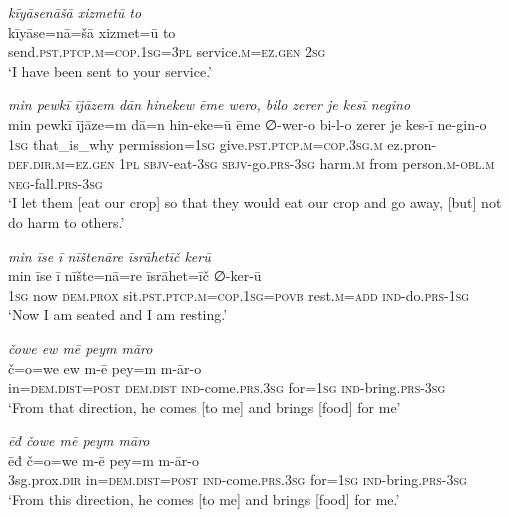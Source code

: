 \ea \label{PM.13}
\textit{kīyāsenāšā xizmetū to} \\ 
\gll kīyāse=nā=šā xizmet=ū to \\ 
 send\textsc{.pst}\textsc{.ptcp}\textsc{.m}\textsc{=cop}\textsc{.\textsc{1sg}}\textsc{=3pl} service\textsc{.m}\textsc{\textsc{=ez.gen}} \textsc{2sg} \\ 
\glt `I have been sent to your service.'
\z 
 
\ea \label{PM.36}
\textit{min pewkī ījāzem dān hinekew ēme wero, bilo zerer je kesī negino} \\ 
\gll min pewkī ījāze=m dā=n hin-eke=ū ēme ∅-wer-o bi-l-o zerer je kes-ī ne-gin-o \\ 
 \textsc{1sg} that\_is\_why permission\textsc{=\textsc{1sg}} give\textsc{.pst}\textsc{.ptcp}\textsc{.m}\textsc{=cop}\textsc{.3sg}\textsc{.m} ez.pron\textsc{-def}\textsc{.dir}\textsc{.m}\textsc{\textsc{=ez.gen}} \textsc{1pl} \textsc{sbjv-}eat\textsc{-3sg} \textsc{sbjv-}go\textsc{.prs}\textsc{-3sg} harm\textsc{.m} from person\textsc{.m}\textsc{-obl}\textsc{.m} \textsc{neg-}fall\textsc{.prs}\textsc{-3sg} \\ 
\glt `I let them [eat our crop] so that they would eat our crop and go away, [but] not do harm to others.'
\z 
 
\ea \label{PM.45}
\textit{min īse ī nīštenāre īsrāhetīč kerū} \\ 
\gll min īse ī nīšte=nā=re īsrāhet=īč ∅-ker-ū \\ 
 \textsc{1sg} now \textsc{dem.prox} sit\textsc{.pst}\textsc{.ptcp}\textsc{.m}\textsc{=cop}\textsc{.\textsc{1sg}}\textsc{=\textsc{povb}} rest\textsc{.m}\textsc{=add} \textsc{ind-}do\textsc{.prs}\textsc{-\textsc{1sg}} \\ 
\glt `Now I am seated and I am resting.'
\z 
 
\ea \label{PM.46}
\textit{čowe ew mē peym māro} \\ 
\gll č=o=we ew m-ē pey=m m-ār-o \\ 
 in=\textsc{dem.dist}\textsc{=\textsc{post}} \textsc{dem.dist} \textsc{ind-}come\textsc{.prs}\textsc{.3sg} for\textsc{=\textsc{1sg}} \textsc{ind-}bring\textsc{.prs}\textsc{-3sg} \\ 
\glt `From that direction, he  comes [to me] and brings [food] for me'
\z 
 
\ea \label{PM.47}
\textit{ēđ čowe mē peym māro} \\ 
\gll ēđ č=o=we m-ē pey=m m-ār-o \\ 
 3sg.prox\textsc{.dir} in=\textsc{dem.dist}\textsc{=\textsc{post}} \textsc{ind-}come\textsc{.prs}\textsc{.3sg} for\textsc{=\textsc{1sg}} \textsc{ind-}bring\textsc{.prs}\textsc{-3sg} \\ 
\glt `From this direction, he  comes [to me] and brings [food] for me.'
\z 
 
